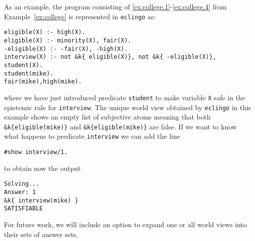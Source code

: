 \documentclass{new_tlp}
\def\eclingo{{\tt eclingo}}
\def\clingo{{\tt clingo}}
\begin{document}
As an example, the program consisting of \eqref{ex:college.1}-\eqref{ex:college.4} from Example~\ref{ex:college} is represented in \eclingo{} as:
\begin{Verbatim}[frame=single]
eligible(X) :- high(X).
eligible(X) :- minority(X), fair(X).
-eligible(X) :- -fair(X), -high(X).
interview(X) :- not &k{ eligible(X)}, not &k{ -eligible(X)}, student(X).
student(mike).
fair(mike),high(mike).
\end{Verbatim}
where we have just introduced predicate {\tt student} to make variable {\tt X} safe in the epistemic rule for {\tt interview}.
%
The unique world view obtained by \eclingo{} in this example shows an empty list of subjective atoms meaning that both \mbox{\tt \&k\{eligible(mike)\}} and \mbox{\tt \&k\{eligible(mike)\}} are false.
%
If we want to know what happens to predicate {\tt interview} we can add the line
\begin{Verbatim}[frame=single]
#show interview/1.
\end{Verbatim}
to obtain now the output
\begin{Verbatim}[frame=single]
Solving...
Answer: 1
&k{ interview(mike) }
SATISFIABLE
\end{Verbatim}
For future work, we will include an option to expand one or all world views into their sets of answer sets.
\end{document}
